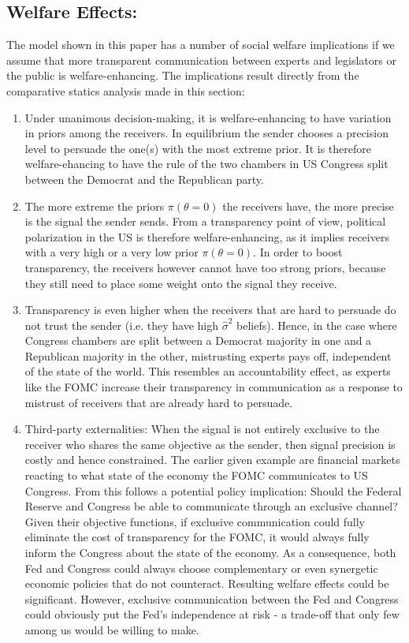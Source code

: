 \documentclass[paper=a4,12pt,DIV=11,twoside=false]{scrartcl}
\begin{document}
\subsection{Welfare Effects:}

\noindent The model shown in this paper has a number of social welfare implications if we assume that more transparent communication between experts and legislators or the public is welfare-enhancing. The implications result directly from the comparative statics analysis made in this section:

\begin{enumerate}
\item Under unanimous decision-making, it is welfare-enhancing to have variation in priors among the receivers. In equilibrium the sender chooses a precision level to persuade the one(s) with the most extreme prior. It is therefore welfare-ehancing to have the rule of the two chambers in US Congress split between the Democrat and the Republican party. 
\item The more extreme the priors $\pi(\theta = 0)$ the receivers have, the more precise is the signal the sender sends. From a transparency point of view, political polarization in the US is therefore welfare-enhancing, as it implies receivers with a very high or a very low prior $\pi(\theta = 0)$. In order to boost transparency, the receivers however cannot have too strong priors, because they still need to place some weight onto the signal they receive.
\item Transparency is even higher when the receivers that are hard to persuade do not trust the sender (i.e. they have high $\hat{\sigma}^2$ beliefs). Hence, in the case where Congress chambers are split between a Democrat majority in one and a Republican majority in the other, mistrusting experts pays off, independent of the state of the world. This resembles an accountability effect, as experts like the FOMC increase their transparency in communication as a response to mistrust of receivers that are already hard to persuade.
\item Third-party externalities: When the signal is not entirely exclusive to the receiver who shares the same objective as the sender, then signal precision is costly and hence constrained. The earlier given example are financial markets reacting to what state of the economy the FOMC communicates to US Congress. From this follows a potential policy implication: Should the Federal Reserve and Congress be able to communicate through an exclusive channel? Given their objective functions, if exclusive communication could fully eliminate the cost of transparency for the FOMC, it would always fully inform the Congress about the state of the economy. As a consequence, both Fed and Congress could always choose complementary or even synergetic economic policies that do not counteract. Resulting welfare effects could be significant. However, exclusive communication between the Fed and Congress could obviously put the Fed's independence at risk - a trade-off that only few among us would be willing to make.
\end{enumerate}
\end{document}
